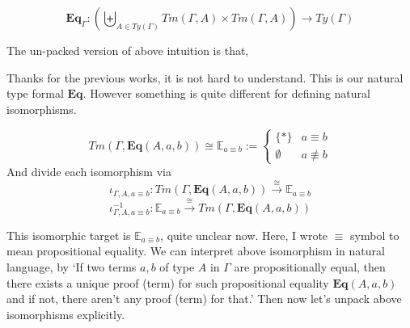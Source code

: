 \documentclass[12pt, a4paper, openany, twoside]{book}
\theoremstyle{definition}
\theoremstyle{remark}
\theoremstyle{plain}
\numberwithin{equation}{section}
\begin{document}
\begin{tcolorbox}[colback=yellow!10!white,colframe=green!75!black,title=Construction 2.4.1. Natural Type Formal]
\[\mathbf{Eq}_\Gamma : \left(\biguplus_{A \in Ty(\Gamma)} Tm(\Gamma, A) \times Tm(\Gamma, A) \right) \rightarrow Ty(\Gamma)\]
\end{tcolorbox}
\vspace{4mm}
The un-packed version of above intuition is that, 
\begin{tcolorbox}[colback=yellow!10!white,colframe=green!75!black,title=Construction 2.4.2.]\hypertarget{const 2.4.2.}{}
\end{tcolorbox}
\vspace{4mm}
Thanks for the previous works, it is not hard to understand. This is our natural type formal $\mathbf{Eq}$. However something is quite different for defining natural isomorphisms. 

\begin{tcolorbox}[colback=yellow!10!white,colframe=green!75!black,title=Construction 2.4.3.]\hypertarget{const 2.4.3.}{}
\[Tm(\Gamma, \mathbf{Eq}(A, a, b)) \cong \mathbb{E}_{a \equiv b} := \begin{cases}
    \{*\} & a \equiv b \\
    \emptyset & a \not\equiv b
\end{cases}\]
And divide each isomorphism via 
\[\iota_{\Gamma, A, a \equiv b} : Tm(\Gamma, \mathbf{Eq}(A, a, b)) \xrightarrow{\cong} \mathbb{E}_{a\equiv b}\]
\[\iota_{\Gamma, A, a \equiv b}^{-1} : \mathbb{E}_{a \equiv b} \xrightarrow{\cong} Tm(\Gamma, \mathbf{Eq}(A, a, b))\]
\end{tcolorbox}
\vspace{4mm}
This isomorphic target is $\mathbb{E}_{a\equiv b}$, quite unclear now. Here, I wrote $\equiv$ symbol to mean propositional equality. 
We can interpret above isomorphism in natural language, by \lq If two terms $a, b$ of type $A$ in $\Gamma$ are propositionally equal, 
then there exists a unique proof (term) for such propositional equality $\mathbf{Eq}(A, a, b)$ and if not, 
there aren't any proof (term) for that.' Then now let's unpack above isomorphisms explicitly. 
\end{document}
